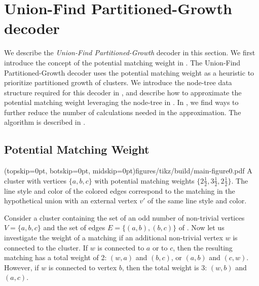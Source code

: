 \section{Union-Find Partitioned-Growth decoder}\label{sec:ufbb}
We describe the \emph{Union-Find Partitioned-Growth} decoder in this section. We first introduce the concept of the potential matching weight in . The Union-Find Partitioned-Growth decoder uses the potential matching weight as a heuristic to prioritize partitioned growth of clusters. We introduce the node-tree data structure required for this decoder in , and describe how to approximate the potential matching weight leveraging the node-tree in . In , we find ways to further reduce the number of calculations needed in the approximation. The algorithm is described in . 

\subsection{Potential Matching Weight}\label{sec:matchingweight}

\Figure[htb](topskip=0pt, botskip=0pt, midskip=0pt){figures/tikz/build/main-figure0.pdf}{
    A cluster with vertices $\{a,b,c\}$ with potential matching weights $\{2\frac{1}{2}, 3\frac{1}{2}, 2\frac{1}{2}\}$. The line style and color of the colored edges correspond to the matching in the hypothetical union with an external vertex $v'$ of the same line style and color.\label{fig0}}


Consider a cluster containing the set of an odd number of non-trivial vertices $V=\{a,b,c\}$ and the set of edges $E=\{(a,b), (b, c)\}$ of . Now let us investigate the weight of a matching if an additional non-trivial vertex $w$ is connected to the cluster. If $w$ is connected to $a$ or to $c$, then the resulting matching has a total weight of 2: $(w,a)$ and $(b,c)$, or $(a,b)$ and $(c,w)$. However, if $w$ is connected to vertex $b$, then the total weight is 3: $(w, b)$ and $(a, c)$. %


